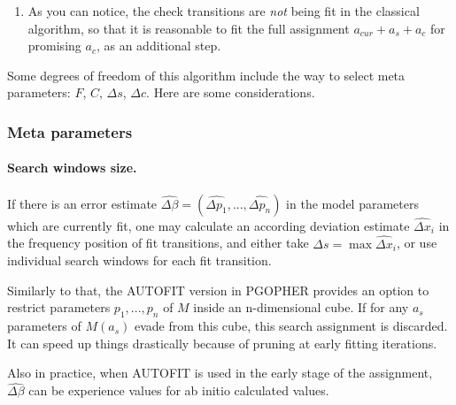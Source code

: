\documentclass[11pt]{article}
\begin{document}
\begin{enumerate}
	\item 
	As you can notice, the check transitions are \emph{not} being fit in the classical algorithm, so that it is reasonable to fit the full assignment $a_{cur} + a_s + a_c$ for promising $a_c$, as an additional step.  
\end{enumerate}


Some degrees of freedom of this algorithm include the way to select meta parameters: $F$, $C$, $\Delta s$, $\Delta c$. Here are some considerations.

\subsubsection{Meta parameters}

\paragraph{Search windows size.}

If there is an error estimate $\widehat {\Delta \beta} = (\widehat {\Delta p_1}, ..., \widehat {\Delta p_n})$ in the model parameters which are currently fit, one may calculate an according deviation estimate $\widehat {\Delta x}_i$ in the frequency position of fit transitions, and either take $\Delta s = \max \widehat {\Delta x}_i$, or use individual search windows for each fit transition.

Similarly to that, the AUTOFIT version in PGOPHER provides an option to restrict parameters $p_1, ..., p_n$ of $M$ inside an n-dimensional cube. If for any ${a_s}$ parameters of $M({a_s})$ evade from this cube, this search assignment is discarded. It can speed up things drastically because of pruning at early fitting iterations.    



Also in practice, when AUTOFIT is used in the early stage of the assignment, $\widehat {\Delta \beta}$ can be experience values for ab initio calculated values.
\end{document}
